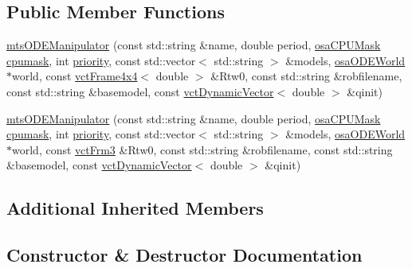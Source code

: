 \subsection*{Public Member Functions}
\begin{DoxyCompactItemize}
\item 
\hyperlink{classmts_o_d_e_manipulator_ab75a6623d972fcadaa16aa22dd120109}{mts\+O\+D\+E\+Manipulator} (const std\+::string \&name, double period, \hyperlink{osa_c_p_u_affinity_8h_aaec7cdd7797e5e6eb5438c15fee5477a}{osa\+C\+P\+U\+Mask} \hyperlink{classmts_o_d_e_manipulator_task_aaff55dbeff38e947707c6b3405041622}{cpumask}, int \hyperlink{classmts_o_d_e_manipulator_task_ae2b16e466e4d216b2cf13ae89414696a}{priority}, const std\+::vector$<$ std\+::string $>$ \&models, \hyperlink{classosa_o_d_e_world}{osa\+O\+D\+E\+World} $\ast$world, const \hyperlink{classvct_frame4x4}{vct\+Frame4x4}$<$ double $>$ \&Rtw0, const std\+::string \&robfilename, const std\+::string \&basemodel, const \hyperlink{classvct_dynamic_vector}{vct\+Dynamic\+Vector}$<$ double $>$ \&qinit)
\item 
\hyperlink{classmts_o_d_e_manipulator_aa68514912f2b9e9d50b8b6d756fba4f8}{mts\+O\+D\+E\+Manipulator} (const std\+::string \&name, double period, \hyperlink{osa_c_p_u_affinity_8h_aaec7cdd7797e5e6eb5438c15fee5477a}{osa\+C\+P\+U\+Mask} \hyperlink{classmts_o_d_e_manipulator_task_aaff55dbeff38e947707c6b3405041622}{cpumask}, int \hyperlink{classmts_o_d_e_manipulator_task_ae2b16e466e4d216b2cf13ae89414696a}{priority}, const std\+::vector$<$ std\+::string $>$ \&models, \hyperlink{classosa_o_d_e_world}{osa\+O\+D\+E\+World} $\ast$world, const \hyperlink{vct_transformation_types_8h_a81feda0a02c2d1bc26e5553f409fed20}{vct\+Frm3} \&Rtw0, const std\+::string \&robfilename, const std\+::string \&basemodel, const \hyperlink{classvct_dynamic_vector}{vct\+Dynamic\+Vector}$<$ double $>$ \&qinit)
\end{DoxyCompactItemize}
\subsection*{Additional Inherited Members}


\subsection{Constructor \& Destructor Documentation}
\hypertarget{classmts_o_d_e_manipulator_ab75a6623d972fcadaa16aa22dd120109}{}
